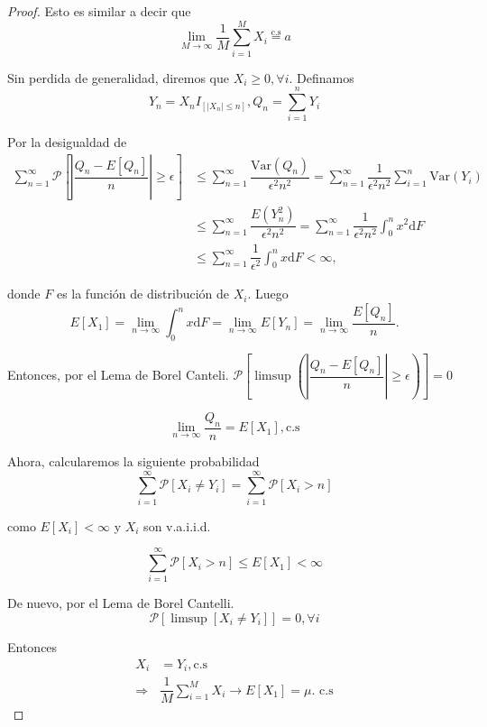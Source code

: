 \documentclass[
  letterpaper,
  DIV=11,
  numbers=noendperiod]{scrreprt}
\theoremstyle{definition}
\theoremstyle{plain}
\theoremstyle{remark}
\begin{document}
\begin{proof}

Esto es similar a decir que \[
\lim_{M\to\infty}\dfrac{1}{M}\sum_{i=1}^{M}X_{i}\stackrel{\text{c.s}}{=}a
\]

Sin perdida de generalidad, diremos que \(X_{i}\geq0,\forall i\).
Definamos \[
Y_{n}=X_{n}I_{\left[\left|X_{n}\right|\leq n\right]},Q_{n}=\sum_{i=1}^{n}Y_{i}
\]

Por la desigualdad de \begin{align*}
\sum_{n=1}^{\infty}\mathcal{P}\left[\left|\dfrac{Q_{n}-E\left[Q_{n}\right]}{n}\right|\geq\epsilon\right] & \leq\sum_{n=1}^{\infty}\dfrac{\text{Var}\left(Q_{n}\right)}{\epsilon^{2}n^{2}}=\sum_{n=1}^{\infty}\dfrac{1}{\epsilon^{2}n^{2}}\sum_{i=1}^{n}\text{Var}\left(Y_{i}\right)\\
& \leq\sum_{n=1}^{\infty}\dfrac{E\left(Y_{n}^{2}\right)}{\epsilon^{2}n^{2}}=\sum_{n=1}^{\infty}\dfrac{1}{\epsilon^{2}n^{2}}\int_{0}^{n}x^{2}\mathrm{d}F\\
& \leq\sum_{n=1}^{\infty}\dfrac{1}{\epsilon^{2}}\int_{0}^{n}x\mathrm{d}F<\infty,
\end{align*}

donde \(F\) es la función de distribución de \(X_{i}\). Luego \[
E\left[X_{1}\right]=\lim_{n\to\infty}\int_{0}^{n}x\mathrm{d}F=\lim_{n\to\infty}E\left[Y_{n}\right]=\lim_{n\to\infty}\dfrac{E\left[Q_{n}\right]}{n}.
\]

Entonces, por el Lema de Borel Canteli.
\(\mathcal{\mathcal{P}}\left[\limsup\left(\left|\dfrac{Q_{n}-E\left[Q_{n}\right]}{n}\right|\geq\epsilon\right)\right]=0\)

\[
\lim_{n\to\infty}\dfrac{Q_{n}}{n}=E\left[X_{1}\right],\text{c.s}
\]

Ahora, calcularemos la siguiente probabilidad \[
\sum_{i=1}^{\infty}\mathcal{P}\left[X_{i}\neq Y_{i}\right]=\sum_{i=1}^{\infty}\mathcal{P}\left[X_{i}>n\right]
\]

como \(E\left[X_{i}\right]<\infty\) y \(X_{i}\) son v.a.i.i.d.

\[
\sum_{i=1}^{\infty}\mathcal{P}\left[X_{i}>n\right]\leq E\left[X_{1}\right]<\infty
\]

De nuevo, por el Lema de Borel Cantelli. \[
\mathcal{P}\left[\limsup\left[X_{i}\neq Y_{i}\right]\right]=0,\forall i
\]

Entonces \begin{align*}
X_{i} & =Y_{i},\text{c.s}\\
\Rightarrow & \dfrac{1}{M}\sum_{i=1}^{M}X_{i}\to E\left[X_{1}\right]=\mu.\text{ c.s}
\end{align*}

\end{proof}
\end{document}
